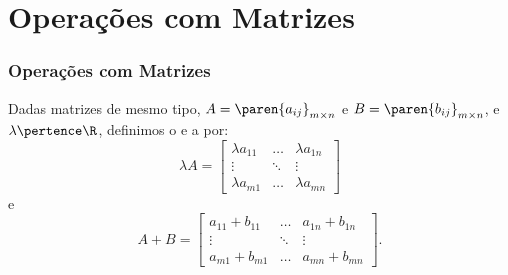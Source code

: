 \section{Operações com Matrizes}


\begin{frame}
    \frametitle{Operações com Matrizes}
    
    \begin{definicao}
        Dadas matrizes de mesmo tipo, $ A = \paren{a_{ij}}_{m \times n}$ e $ B = \paren{b_{ij}}_{m \times n}$, e $\lambda \pertence \R$, definimos o  e a  por:
        \begin{displaymath} \lambda A = 
            \begin{bmatrix}
                \lambda a_{11} & \dots & \lambda a_{1n} \\
                \vdots & \ddots & \vdots \\
                \lambda a_{m1} & \dots & \lambda a_{mn}
            \end{bmatrix}
        \end{displaymath}
        e
        \begin{displaymath}    A+B=
            \begin{bmatrix}
                a_{11} + b_{11} & \dots & a_{1n} + b_{1n} \\
                \vdots & \ddots & \vdots \\
                a_{m1} + b_{m1} & \dots & a_{mn} + b_{mn}
            \end{bmatrix}.
        \end{displaymath}
    \end{definicao}
\end{frame}


